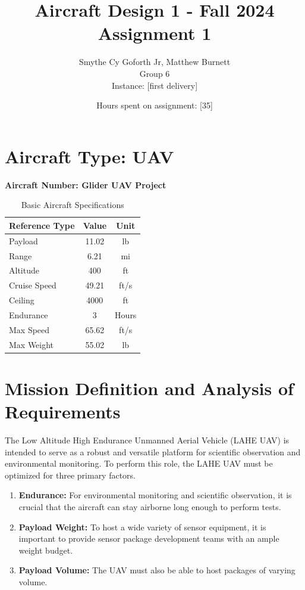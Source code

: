 \documentclass[12pt]{article}
\title{Aircraft Design 1 - Fall 2024 \\ Assignment 1}
\author{Smythe Cy Goforth Jr, Matthew Burnett \\ Group 6 \\ Instance: [first delivery]}
\date{Hours spent on assignment: [35]}
\begin{document}
	
	\maketitle
	
	\section*{Aircraft Type: UAV}
	\textbf{Aircraft Number: Glider UAV Project}
	
	\begin{table}[h!]
		\centering
		\begin{tabular}{|l|c|c|}
			\hline
			Reference Type & Value & Unit \\ 
			\hline
			Payload & 11.02 & lb \\ 
			Range & 6.21 & mi \\ 
			Altitude & 400 & ft \\ 
			Cruise Speed & 49.21 & ft/s \\ 
			Ceiling & 4000 & ft \\ 
			Endurance & 3 & Hours \\ 
			Max Speed & 65.62 & ft/s \\ 
			Max Weight & 55.02 & lb \\ 
			\hline
		\end{tabular}
		\caption{Basic Aircraft Specifications}
	\end{table}
	
	\newpage
	
	\tableofcontents
	
	\newpage
	
	
	\section{Mission Definition and Analysis of Requirements}
	The Low Altitude High Endurance Unmanned Aerial Vehicle (LAHE UAV) is intended to serve as a robust and versatile platform for scientific observation and environmental monitoring. To perform this role, the LAHE UAV must be optimized for three primary factors.
	
	\begin{enumerate}
		\item \textbf{Endurance:} For environmental monitoring and scientific observation, it is crucial that the aircraft can stay airborne long enough to perform tests. 
		\item \textbf{Payload Weight:} To host a wide variety of sensor equipment, it is important to provide sensor package development teams with an ample weight budget.
		\item \textbf{Payload Volume:} The UAV must also be able to host packages of varying volume.
	\end{enumerate}
	
\end{document}
